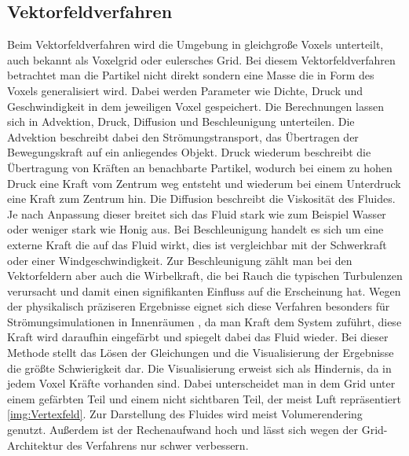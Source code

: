 \documentclass[intern,palatino]{cgBA}
\begin{document}
\subsection{Vektorfeldverfahren}\label{vektor}
Beim Vektorfeldverfahren wird die Umgebung in gleichgroße Voxels unterteilt, auch bekannt als Voxelgrid oder eulersches Grid. Bei diesem Vektorfeldverfahren betrachtet man die Partikel nicht direkt sondern eine Masse die in Form des Voxels generalisiert wird. Dabei werden Parameter wie Dichte, Druck und Geschwindigkeit in dem jeweiligen Voxel gespeichert. Die Berechnungen lassen sich in Advektion, Druck, Diffusion und Beschleunigung unterteilen. Die Advektion beschreibt dabei den Strömungstransport, das Übertragen der Bewegungskraft auf ein anliegendes Objekt. Druck wiederum beschreibt die Übertragung von Kräften an benachbarte Partikel, wodurch bei einem zu hohen Druck eine Kraft vom Zentrum weg entsteht und wiederum bei einem Unterdruck eine Kraft zum Zentrum hin. Die Diffusion beschreibt die Viskosität des Fluides. Je nach Anpassung dieser breitet sich das Fluid stark wie zum Beispiel Wasser oder weniger stark wie Honig aus.
Bei Beschleunigung handelt es sich um eine externe Kraft die auf das Fluid wirkt, dies ist vergleichbar mit der Schwerkraft oder einer Windgeschwindigkeit. Zur Beschleunigung zählt man bei den Vektorfeldern aber auch die Wirbelkraft, die bei Rauch die typischen Turbulenzen verursacht und damit einen signifikanten Einfluss auf die Erscheinung hat.
\newline
Wegen der physikalisch präziseren Ergebnisse eignet sich diese Verfahren besonders für Strömungsimulationen in Innenräumen \cite{franz}, da man Kraft dem System zuführt, diese Kraft wird daraufhin eingefärbt und spiegelt dabei das Fluid wieder.
\newline
Bei dieser Methode stellt das Lösen der Gleichungen und die Visualisierung der Ergebnisse die größte Schwierigkeit dar. Die Visualisierung erweist sich als Hindernis, da in jedem Voxel Kräfte vorhanden sind. Dabei unterscheidet man in dem Grid unter einem gefärbten Teil und einem nicht sichtbaren Teil, der meist Luft repräsentiert \ref{img:Vertexfeld}. Zur Darstellung des Fluides wird meist Volumerendering genutzt. Außerdem ist der Rechenaufwand hoch und lässt sich wegen der Grid-Architektur des Verfahrens nur schwer verbessern.
\end{document}
